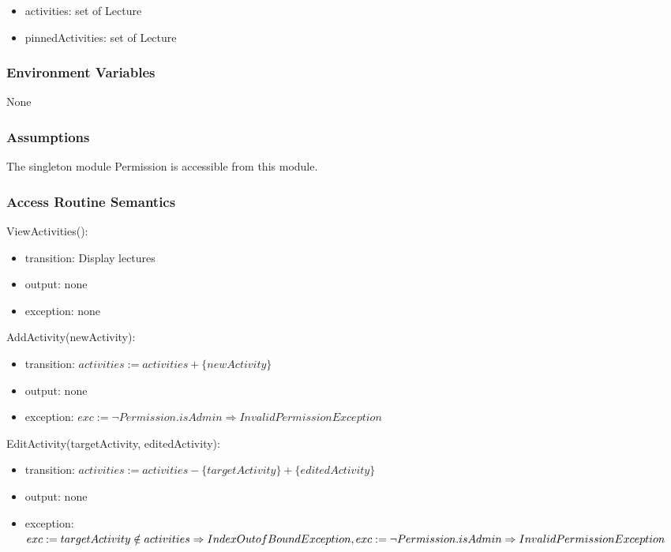 \documentclass[12pt, titlepage]{article}
\begin{document}
\begin{itemize}
  \item activities: set of Lecture
  \item pinnedActivities: set of Lecture
\end{itemize}

\subsubsection{Environment Variables}

None

\subsubsection{Assumptions}

The singleton module Permission is accessible from this module.

\subsubsection{Access Routine Semantics}

\noindent ViewActivities():
\begin{itemize}
\item transition: Display lectures
\item output: none
\item exception: none
\end{itemize}

\noindent AddActivity(newActivity):
\begin{itemize}
\item transition: $activities := activities + \{newActivity\}$
\item output: none
\item exception: $exc := \neg Permission.isAdmin \Rightarrow InvalidPermission Exception$
\end{itemize}

\noindent EditActivity(targetActivity, editedActivity):
\begin{itemize}
\item transition: $activities := activities - \{targetActivity\} + \{editedActivity\}$
\item output: none
\item exception: $exc := targetActivity \notin activities \Rightarrow IndexOutofBound Exception,\\ 
                  exc := \neg Permission.isAdmin \Rightarrow InvalidPermission Exception$
\end{itemize}
\end{document}
